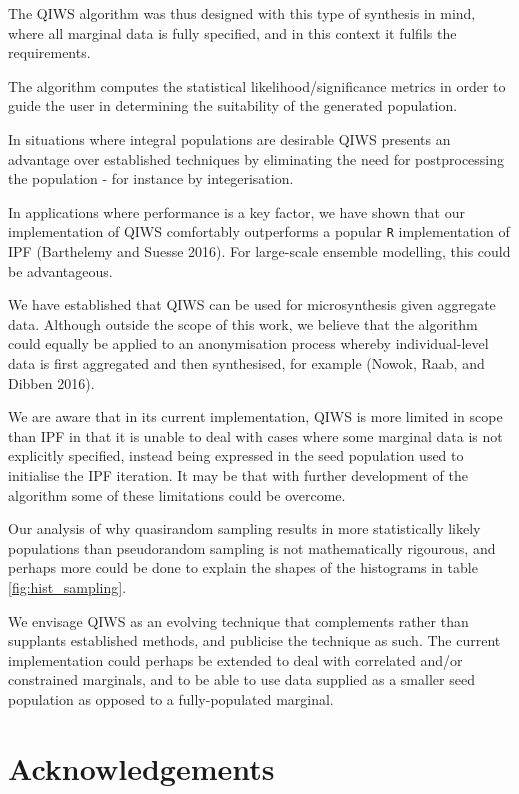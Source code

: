 \documentclass{JASSS}
\begin{document}
The QIWS algorithm was thus designed with this type of synthesis in
mind, where all marginal data is fully specified, and in this context it
fulfils the requirements.

The algorithm computes the statistical likelihood/significance metrics in 
order to guide the user in determining the suitability of the generated population.

In situations where integral populations are desirable QIWS presents an
advantage over established techniques by eliminating the need for
postprocessing the population - for instance by integerisation.

In applications where performance is a key factor, we have shown that
our implementation of QIWS comfortably outperforms a popular \texttt{R}
implementation of IPF (Barthelemy and Suesse 2016). For large-scale
ensemble modelling, this could be advantageous.

We have established that QIWS can be used for microsynthesis given
aggregate data. Although outside the scope of this work, we believe that
the algorithm could equally be applied to an anonymisation process
whereby individual-level data is first aggregated and then synthesised,
for example (Nowok, Raab, and Dibben 2016).

We are aware that in its current implementation, QIWS is more limited in scope than IPF in that it is
unable to deal with cases where some marginal data is not explicitly
specified, instead being expressed in the seed population used to
initialise the IPF iteration. It may be that with further development of
the algorithm some of these limitations could be overcome.

Our analysis of why quasirandom sampling results in more statistically likely populations than pseudorandom sampling is not mathematically rigourous, and perhaps more could be done to explain the shapes of the histograms in table \ref{fig:hist_sampling}.

We envisage QIWS as an evolving technique that complements rather than
supplants established methods, and publicise the technique as such. The current implementation could perhaps be extended to deal with correlated and/or constrained marginals, and to be able to use data supplied as a smaller seed population as opposed to a fully-populated marginal.

\section{Acknowledgements}\label{acknowledgements}
\end{document}
